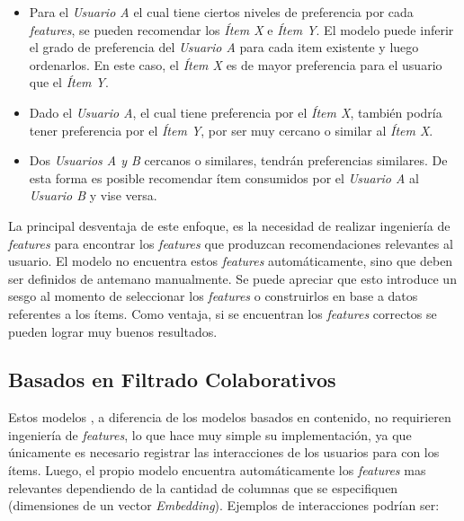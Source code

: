 \documentclass[11pt,a4paper,twoside]{thesis}
\begin{document}
\begin{itemize}
	\item Para el \textit{Usuario A} el cual tiene ciertos niveles de preferencia por
	      cada \textit{features}, se pueden recomendar los \textit{Ítem X} e \textit{Ítem
		      Y}. El modelo puede inferir el grado de preferencia del \textit{Usuario A} para
	      cada item existente y luego ordenarlos. En este caso, el \textit{Ítem X} es de
	      mayor preferencia para el usuario que el \textit{Ítem Y}.

	\item Dado el \textit{Usuario A}, el cual tiene preferencia por el \textit{Ítem X},
	      también podría tener preferencia por el \textit{Ítem Y}, por ser muy cercano o
	      similar al \textit{Ítem X}.

	\item Dos \textit{Usuarios A y B} cercanos o similares, tendrán preferencias
	      similares. De esta forma es posible recomendar ítem consumidos por el
	      \textit{Usuario A} al \textit{Usuario B} y vise versa.
\end{itemize}

La principal desventaja de este enfoque, es la necesidad de realizar ingeniería
de \textit{features} para encontrar los \textit{features} que produzcan
recomendaciones relevantes al usuario. El modelo no encuentra estos
\textit{features} automáticamente, sino que deben ser definidos de antemano
manualmente. Se puede apreciar que esto introduce un sesgo al momento de
seleccionar los \textit{features} o construirlos en base a datos referentes a
los ítems. Como ventaja, si se encuentran los \textit{features} correctos se
pueden lograr muy buenos resultados.

\subsection{Basados en Filtrado Colaborativos}

Estos modelos \cite{viedma2016introduccion, glauber2019collaborative}, a
diferencia de los modelos basados en contenido, no requirieren ingeniería de
\textit{features}, lo que hace muy simple su implementación, ya que únicamente
es necesario registrar las interacciones de los usuarios para con los ítems.
Luego, el propio modelo encuentra automáticamente los \textit{features} mas
relevantes dependiendo de la cantidad de columnas que se especifiquen
(dimensiones de un vector \textit{Embedding}). Ejemplos de interacciones
podrían ser:
\end{document}

